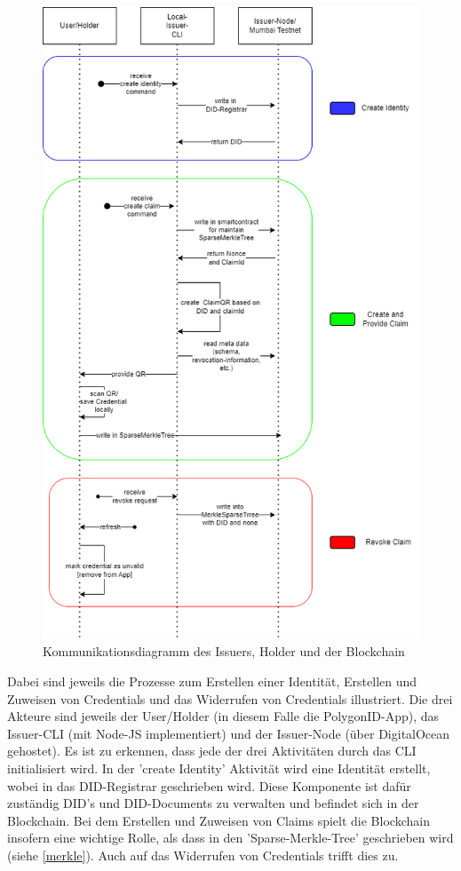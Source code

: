 \begin{figure}[H]
	\centering	
	\includegraphics[scale=0.55]{media/ablaufdiagram.drawio}
	\caption{Kommunikationsdiagramm des Issuers, Holder und der Blockchain}
	\label{fig:komm}
\end{figure}
\newpage
Dabei sind jeweils die Prozesse zum Erstellen einer Identität, Erstellen und Zuweisen von Credentials und das Widerrufen von Credentials illustriert. Die drei Akteure sind jeweils der User/Holder (in diesem Falle die PolygonID-App), das Issuer-CLI (mit Node-JS implementiert) und der Issuer-Node (über DigitalOcean gehostet). Es ist zu erkennen, dass jede der drei Aktivitäten durch das CLI initialisiert wird. In der 'create Identity' Aktivität wird eine Identität erstellt, wobei in das DID-Registrar geschrieben wird. Diese Komponente ist dafür zuständig DID's und DID-Documents zu verwalten und befindet sich in der Blockchain.
Bei dem Erstellen und Zuweisen von Claims spielt die Blockchain insofern eine wichtige Rolle, als dass in den 'Sparse-Merkle-Tree' geschrieben wird (siehe \ref{merkle}). Auch auf das Widerrufen von Credentials trifft dies zu.
